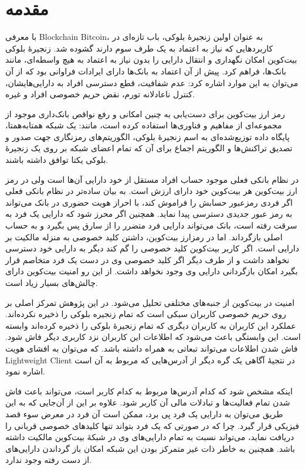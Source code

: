 
\chapter{مقدمه}
با معرفی \gls{Blockchain} \gls{Bitcoin}، به عنوان اولین زنجیرهٔ بلوکی، باب تازه‌ای در کاربرد‌هایی که نیاز به اعتماد به یک طرف سوم دارند گشوده شد. زنجیرهٔ بلوکی بیت‌کوین امکان نگهداری و انتقال دارایی را بدون نیاز به اعتماد به هیچ واسطه‌ای، مانند بانک‌ها،‌ فراهم کرد. پیش از آن اعتماد به بانک‌ها دارای ایرادات فراوانی بود که از آن می‌توان به این موارد اشاره کرد: عدم شفافیت، قطع دسترسی افراد به دارایی‌هایشان، کنترل ناعادلانه تورم، نقض حریم خصوصی افراد و غیره. 

رمز ارز بیت‌کوین برای دست‌یابی به چنین امکانی و رفع نواقص بانک‌داری موجود از مجموعه‌ای از مفاهیم و فناوری‌ها استفاده کرده است، مانند: یک شبکه همتا‌به‌همتا، پایگاه داده توزیع‌شده‌ای به اسم زنجیرهٔ بلوکی، الگوریتم‌های رمزنگاری جهت صدور و تصدیق تراکنش‌ها و الگوریتم اجماع برای آن‌ که تمام اعضای شبکه بر روی یک زنجیرهٔ بلوکی یکتا توافق داشته باشند. 

در نظام بانکی فعلی موجود حساب افراد مستقل از خود دارایی آن‌ها است ولی در رمز ارز بیت‌کوین هر بیت‌کوین خود دارای ارزش است. به بیان ساده‌تر در نظام بانکی فعلی اگر فردی رمزعبور حسابش را فراموش کند، با احراز هویت حضوری در بانک می‌تواند به رمز عبور جدیدی دسترسی پیدا نماید. همچنین اگر محرز شود که دارایی یک فرد به سرقت رفته است، بانک می‌تواند دارایی فرد متضرر را از سارق پس بگیرد و به حساب اصلی بازگرداند. اما در رمزارز بیت‌کوین، داشتن کلید خصوصی به منزله مالکیت بر دارایی است. اگر کاربر بیت‌کوین کلید خصوصی را گم کند دیگر به دارایی خود دسترسی نخواهد داشت و از طرف دیگر اگر کلید خصوصی وی در دست یک فرد متخاصم قرار بگیرد امکان بازگردانی دارایی وی وجود نخواهد داشت. از این رو امنیت بیت‌کوین دارای چالش‌های بسیار زیاد است.

امنیت در بیت‌کوین از جنبه‌های مختلفی تحلیل می‌شود. در این پژوهش تمرکز اصلی بر روی حریم خصوصی کاربران سبکی است که تمام زنجیره بلوکی را ذخیره نکرده‌اند. عملکرد این کاربران به کاربران دیگری که تمام زنجیره‌ٔ بلوکی را ذخیره کرده‌اند وابسته است. این وابستگی باعث می‌شود که اطلاعات این کاربران نزد کاربری دیگر فاش شود. فاش شدن اطلاعات می‌تواند تبعاتی به همراه داشته باشد. که می‌توان به افشای هویت 
\gls{Lightweight Client}
در نتجیهٔ آگاهی یک گره دیگر از آدرس‌هایی که مربوط به آن است اشاره نمود. 

اینکه مشخص شود که کدام آدرس‌ها مربوط به کدام کاربر است، می‌تواند باعث فاش شدن تمام فعالیت‌ها و تبادلات مالی آن کاربر شود. علاوه بر این از آن‌جایی که به این طریق می‌توان به دارایی یک فرد پی برد، ممکن است آن فرد در معرض سوء قصد فیزیکی قرار گیرد. چرا که در صورتی که یک فرد بتواند تنها کلید‌های خصوصی قربانی را دریافت نماید، می‌تواند نسبت به تمام دارایی‌های وی در شبکه‌ٔ بیت‌کوین مالکیت داشته باشد. همچنین به خاطر ذات غیر متمرکز بودن این شبکه امکان باز گرداندن دارایی‌های از دست رفته وجود ندارد.


